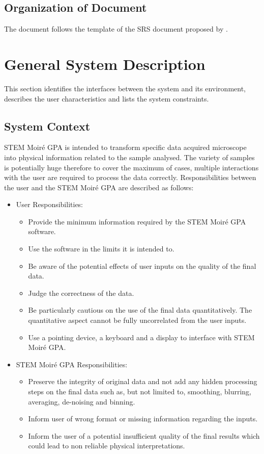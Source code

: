 \documentclass[12pt]{article}
\newcommand{\progname}{STEM Moir{\'e} GPA}
\begin{document}
\subsection{Organization of Document}

The document follows the template of the SRS document proposed by \cite{SmithAndLai2005, SmithEtAl2007}. 

\section{General System Description}

This section identifies the interfaces between the system and its environment,
describes the user characteristics and lists the system constraints.

\subsection{System Context}

\progname{} is intended to transform specific data acquired microscope into physical information related to the sample analysed. The variety of samples is potentially huge therefore to cover the maximum of cases, multiple interactions with the user are required to process the data correctly. Responsibilities between the user and the \progname{} are described as follows:

\begin{itemize}
\item User Responsibilities:
\begin{itemize}
\item Provide the minimum information required by the \progname{} software.
\item Use the software in the limits it is intended to.
\item Be aware of the potential effects of user inputs on the quality of the final data.
\item Judge the correctness of the data.
\item Be particularly cautious on the use of the final data quantitatively. The quantitative aspect cannot be fully uncorrelated from the user inputs. 
\item Use a pointing device, a keyboard and a display to interface with \progname{}.
\end{itemize}
\item \progname{} Responsibilities:
\begin{itemize}
\item Preserve the integrity of original data and not add any hidden processing steps on the final data such as, but not limited to, smoothing, blurring, averaging, de-noising and binning.
\item Inform user of wrong format or missing information regarding the inputs.
\item Inform the user of a potential insufficient quality of the final results which could lead to non reliable physical interpretations.
\end{itemize}
\end{itemize}
\end{document}
